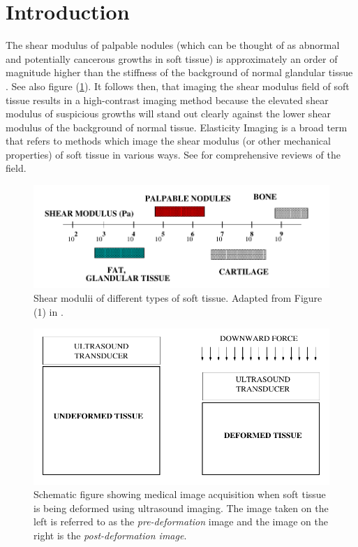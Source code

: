 \documentclass[12pt]{article}
\begin{document}
\section{Introduction}
The shear modulus of palpable nodules (which can be thought of as abnormal and potentially cancerous growths in soft tissue) is approximately an order of magnitude higher than the stiffness of the background of normal glandular tissue \cite{paper:sarv1998}. See also figure (\ref{fig:shearmod}). It follows then, that imaging the shear modulus field of soft tissue results in a high-contrast imaging method because the elevated shear modulus of suspicious growths will stand out clearly against the lower shear modulus of the background of normal tissue. Elasticity Imaging is a broad term that refers to methods which image the shear modulus (or other mechanical properties) of soft tissue in various ways. See \cite{paper:gao1996,paper:parker2010,book:alamgarra2019,bookchap:oberaibarbone2019} for comprehensive reviews of the field.
%
\begin{figure}[h]
   \centering
    \includegraphics[totalheight=3cm]{Figures/shearmod.png}
  \caption{\label{fig:shearmod} Shear modulii of different types of soft tissue. Adapted from Figure (1) in \cite{paper:sarv1998}.}
\end{figure}
%
\begin{figure}[h]
   \centering
    \includegraphics[totalheight=5cm]{Figures/prepostimage.png}
  \caption{\label{fig:prepostimage} Schematic figure showing medical image acquisition when soft tissue is being deformed using ultrasound imaging. The image taken on the left is referred to as the \textit{pre-deformation} image and the image on the right is the \textit{post-deformation image}.}
\end{figure}
%
\end{document}
